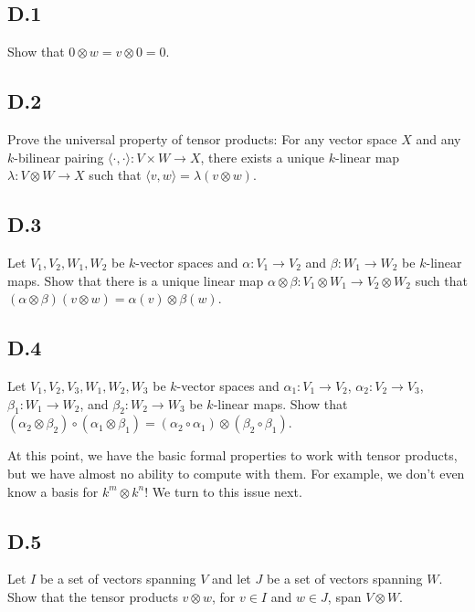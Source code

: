 \documentclass[lang=cn,11pt]{template}
\begin{document}
\subsection*{D.1} Show that \( 0 \otimes w = v \otimes 0 = 0 \).

\subsection*{D.2} Prove the universal property of tensor products: For any vector space \( X \) and any \( k \)-bilinear pairing \( \langle \cdot , \cdot \rangle : V \times W \to X \), there exists a unique \( k \)-linear map \( \lambda : V \otimes W \to X \) such that \( \langle v, w \rangle = \lambda(v \otimes w) \).

\subsection*{D.3} Let \( V_1, V_2, W_1, W_2 \) be \( k \)-vector spaces and \( \alpha : V_1 \to V_2 \) and \( \beta : W_1 \to W_2 \) be \( k \)-linear maps. Show that
there is a unique linear map \( \alpha \otimes \beta : V_1 \otimes W_1 \to V_2 \otimes W_2 \) such that \( (\alpha \otimes \beta)(v \otimes w) = \alpha(v) \otimes \beta(w) \).

\subsection*{D.4} Let \( V_1, V_2, V_3, W_1, W_2, W_3 \) be \( k \)-vector spaces and \( \alpha_1 : V_1 \to V_2 \), \( \alpha_2 : V_2 \to V_3 \), \( \beta_1 : W_1 \to W_2 \), and \( \beta_2 : W_2 \to W_3 \) be \( k \)-linear maps. Show that \( (\alpha_2 \otimes \beta_2) \circ (\alpha_1 \otimes \beta_1) = (\alpha_2 \circ \alpha_1) \otimes (\beta_2 \circ \beta_1) \).

At this point, we have the basic formal properties to work with tensor products, but we have almost no ability to compute with them. For example, we don’t even know a basis for \( k^m \otimes k^n \)! We turn to this issue next.

\subsection*{D.5} Let \( I \) be a set of vectors spanning \( V \) and let \( J \) be a set of vectors spanning \( W \). Show that the tensor products \( v \otimes w \), for \( v \in I \) and \( w \in J \), span \( V \otimes W \).
\end{document}

